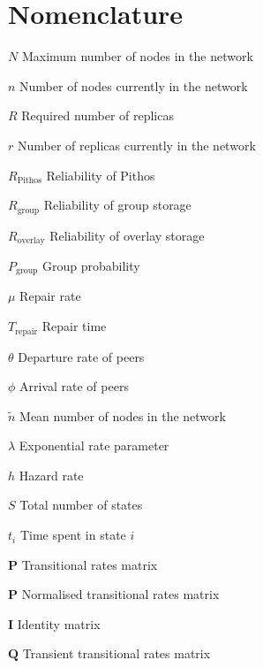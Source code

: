 \chapter{Nomenclature}

\newlength{\gnat}

\begin{Nomencl}[\gnat]

		\item[$N$]                      Maximum number of nodes in the network
        \item[$n$]                      Number of nodes currently in the network
        \item[$R$]                      Required number of replicas
        \item[$r$]                      Number of replicas currently in the network
        \item[$R_{\textrm{Pithos}}$]    Reliability of Pithos
        \item[$R_{\textrm{group}}$]     Reliability of group storage
        \item[$R_{\textrm{overlay}}$]   Reliability of overlay storage
        \item[$P_{\textrm{group}}$]     Group probability
        \item[$\mu$]                    Repair rate
        \item[$T_{\textrm{repair}}$]    Repair time
        \item[$\theta$]                 Departure rate of peers
        \item[$\phi$]                   Arrival rate of peers
        \item[$\tilde{n}$]              Mean number of nodes in the network
        \item[$\lambda$]                Exponential rate parameter
        \item[$h$]                      Hazard rate
        \item[$S$]                      Total number of states
        \item[$t_i$]                    Time spent in state $i$
        \item[$\textbf{P}$]             Transitional rates matrix
        \item[$\textbf{\^{P}}$]         Normalised transitional rates matrix
        \item[$\textbf{I}$]             Identity matrix
        \item[$\textbf{Q}$]             Transient transitional rates matrix

\end{Nomencl}
